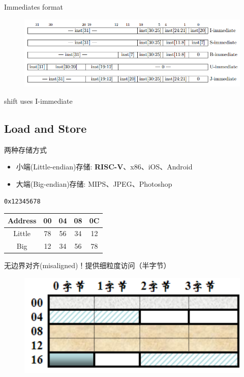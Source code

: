 \documentclass{myslide}
\begin{document}
\begin{frame}[fragile]{Immediates format}
\begin{figure}
\centering
\includegraphics[width=\linewidth]{fig/Lecture2/imm.PNG}
\end{figure}
shift uses I-immediate
\end{frame}

\subsection{Load and Store}
\begin{frame}
\subsectionpage
\end{frame}

\begin{frame}[fragile]{两种存储方式}
\begin{itemize}
	\item 小端(Little-endian)存储: \textbf{RISC-V}、x86、iOS、Android
	\item 大端(Big-endian)存储: MIPS、JPEG、Photoshop
\end{itemize}
\begin{center}
\verb'0x12345678'\qquad
\begin{tabular}{ccccc}
Address & 00 & 04 & 08 & 0C\\\hline
Little & 78 & 56 & 34 & 12\\\hline
Big & 12 & 34 & 56 & 78\\\hline
\end{tabular}
\end{center}
无边界对齐(misaligned)！提供细粒度访问（半字节）
\begin{figure}
\centering
\includegraphics[width=0.4\linewidth]{fig/Lecture2/aligned.PNG}
\end{figure}
\end{frame}
\end{document}
